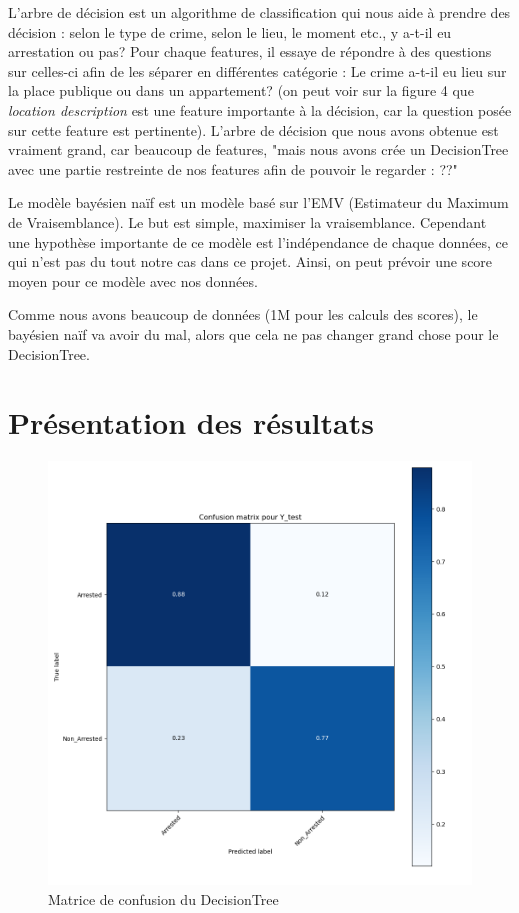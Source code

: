\documentclass{article}
\begin{document}
    L'arbre de décision est un algorithme de classification qui nous aide 
    à prendre des décision :
    selon le type de crime, selon le lieu, le moment etc., y a-t-il eu arrestation ou pas?
    Pour chaque features, il essaye de répondre à des questions sur celles-ci afin
    de les séparer en différentes catégorie : 
    Le crime a-t-il eu lieu sur la place publique ou dans un appartement?
    (on peut voir sur la figure 4 que \textit{location description} est une feature
    importante à la décision, car la question posée sur cette feature est pertinente).
    L'arbre de décision que nous avons obtenue est vraiment grand, car beaucoup de
    features, "mais nous avons crée un DecisionTree avec une partie restreinte de
    nos features afin de pouvoir le regarder : ??"

    Le modèle bayésien naïf est un modèle basé sur l'EMV
    (Estimateur du Maximum de Vraisemblance).
    Le but est simple, maximiser la vraisemblance. 
    Cependant une hypothèse importante de ce modèle est l'indépendance de chaque données,
    ce qui n'est pas du tout notre cas dans ce projet.
    Ainsi, on peut prévoir une score moyen pour ce modèle avec nos données.

    Comme nous avons beaucoup de données (1M pour les calculs des scores),
    le bayésien naïf va avoir du mal, alors que cela ne pas changer grand
    chose pour le DecisionTree.

    \section{Présentation des résultats}

    \begin{figure}[H]
            \centering
	    \includegraphics[scale=.35]{Images/Matrice de confusion.png}
	    \caption{Matrice de confusion du DecisionTree}
    \end{figure}
\end{document}
